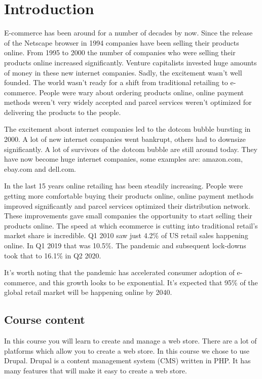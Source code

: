 \chapter{Introduction}
\label{ch:introduction}

E-commerce has been around for a number of decades by now. Since the release of the Netscape browser in 1994 companies have been selling their products online. From 1995 to 2000 the number of companies who were selling their products online increased significantly. Venture capitalists invested huge amounts of money in these new internet companies. Sadly, the excitement wasn’t well founded. The world wasn’t ready for a shift from traditional retailing to e-commerce. People were wary about ordering products online, online payment methods weren’t very widely accepted and parcel services weren’t optimized for delivering the products to the people.

The excitement about internet companies led to the dotcom bubble bursting in 2000. A lot of new internet companies went bankrupt, others had to downsize significantly. A lot of survivors of the dotcom bubble are still around today. They have now become huge internet companies, some examples are: amazon.com, ebay.com and dell.com.

In the last 15 years online retailing has been steadily increasing. People were getting more comfortable buying their products online, online payment methods improved significantly and parcel services optimized their distribution network. These improvements gave small companies the opportunity to start selling their products online.
The speed at which ecommerce is cutting into traditional retail’s market share is incredible. Q1 2010 saw just 4.2\% of US retail sales happening online. In Q1 2019 that was 10.5\%. The pandemic and subsequent lock-downs took that to 16.1\% in Q2 2020.

It’s worth noting that the pandemic has accelerated consumer adoption of e-commerce, and this growth looks to be exponential. It’s expected that 95\% of the global retail market will be happening online by 2040. \cite{RetailVsEcom2022}

\section{Course content}
In this course you will learn to create and manage a web store. There are a lot of platforms which allow you to create a web store. In this course we chose to use Drupal. Drupal is a content management system (CMS) written in PHP. It has many features that will make it easy to create a web store.


